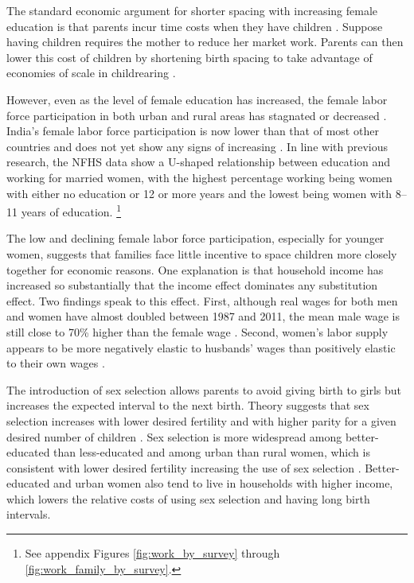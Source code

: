 \documentclass[12pt,letterpaper]{article}
\begin{document}

The standard economic argument for shorter spacing with increasing female education 
is that parents incur time costs when they have children \citep{Hotz1997,schultz97}.
Suppose having children requires the mother to reduce her market work. 
Parents can then lower this cost of children by shortening birth spacing to take advantage 
of economies of scale in childrearing  \citep{Vijverberg1982}.

However, even as the level of female education has increased, the female labor force 
participation in both urban and rural areas has stagnated or decreased
\citep{Klasen2015,Fletcher2017,Afridi2018,Bhargava2018,Chatterjee2018,Bhargava2019}.
India's female labor force participation is now lower than that of most other countries and does 
not yet show any signs of increasing \citep{Klasen2015,Chatterjee2018}.
In line with previous research, the NFHS data show a U-shaped relationship between 
education and working for married women, with the highest percentage working being women with 
either no education or 12 or more years and the lowest being women with 8--11 years of education.%
\footnote{
See appendix Figures \ref{fig:work_by_survey} through \ref{fig:work_family_by_survey}. 
}

The low and declining female labor force participation, especially for younger women, 
suggests that families face little incentive to space children more closely 
together for economic reasons.
One explanation is that household income has increased so substantially that the income 
effect dominates any substitution effect.
Two findings speak to this effect.
First, although real wages for both men and women have almost doubled between 1987 and 
2011, the mean male wage is still close to 70\% higher than the female wage 
\citep{Klasen2015,Bhargava2018}.
Second, women’s labor supply appears to be more negatively elastic to husbands' 
wages than positively elastic to their own wages \citep{Bhargava2018}.



The introduction of sex selection allows parents to avoid giving birth to girls but 
increases the expected interval to the next birth.
Theory suggests that sex selection increases with lower desired fertility and with
higher parity for a given desired number of children \citep{Portner2015b}.
Sex selection is more widespread among better-educated than less-educated and among urban 
than rural women, which is consistent with lower desired fertility increasing the
use of sex selection 
\citep{das_gupta97,retherford03b,Guilmoto2009a,Portner2015b,Jayachandran2017}.
Better-educated and urban women also tend to live in households with higher income, which 
lowers the relative costs of using sex selection and having long birth intervals.
\end{document}
